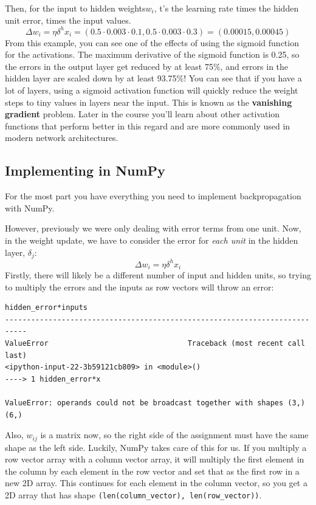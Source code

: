 Then, for the input to hidden weights\(w_i\), t's the learning rate times the hidden unit error, times the input values. \[\Delta w_i = \eta \delta^h x_i = (0.5 \cdot 0.003 \cdot 0.1, 0.5 \cdot 0.003 \cdot 0.3) = (0.00015, 0.00045)\]
From this example, you can see one of the effects of using the sigmoid function for the activations. The maximum derivative of the sigmoid function is 0.25, so the errors in the output layer get reduced by at least 75\%, and errors in the hidden layer are scaled down by at least 93.75\%! You can see that if you have a lot of layers, using a sigmoid activation function will quickly reduce the weight steps to tiny values in layers near the input. This is known as the \textbf{vanishing gradient} problem. Later in the course you'll learn about other activation functions that perform better in this regard and are more commonly used in modern network architectures.

\subsection{Implementing in NumPy}

For the most part you have everything you need to implement backpropagation with NumPy.

However, previously we were only dealing with error terms from one unit. Now, in the weight update, we have to consider the error for \textit{each unit} in the hidden layer, \(\delta_j\): \[\Delta w_i = \eta \delta^h x_i\]
Firstly, there will likely be a different number of input and hidden units, so trying to multiply the errors and the inputs as row vectors will throw an error:

\begin{lstlisting}
hidden_error*inputs
---------------------------------------------------------------------------
ValueError                                Traceback (most recent call last)
<ipython-input-22-3b59121cb809> in <module>()
----> 1 hidden_error*x

ValueError: operands could not be broadcast together with shapes (3,) (6,) 
\end{lstlisting}

Also, \(w_{ij}\) is a matrix now, so the right side of the assignment must have the same shape as the left side. Luckily, NumPy takes care of this for us. If you multiply a row vector array with a column vector array, it will multiply the first element in the column by each element in the row vector and set that as the first row in a new 2D array. This continues for each element in the column vector, so you get a 2D array that has shape \lstinline{(len(column_vector), len(row_vector))}.

